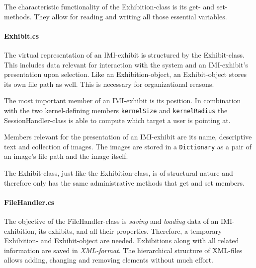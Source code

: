 The characteristic functionality of the Exhibition-class is its get- and set-methods. They allow for reading and writing all those essential variables.


\paragraph{Exhibit.cs} The virtual representation of an \ac{IMI}-exhibit is structured by the Exhibit-class. This includes data relevant for interaction with the system and an \ac{IMI}-exhibit's presentation upon selection. Like an Exhibition-object, an Exhibit-object stores its own file path as well. This is necessary for organizational reasons. 

The most important member of an \ac{IMI}-exhibit is its position. In combination with the two kernel-defining members \texttt{kernelSize} and \texttt{kernelRadius} the SessionHandler-class is able to compute which target a user is pointing at.  

Members relevant for the presentation of an \ac{IMI}-exhibit are its name, descriptive text and collection of images. The images are stored in a \texttt{Dictionary} as a pair of an image's file path and the image itself. 

The Exhibit-class, just like the Exhibition-class, is of structural nature and therefore only has the same administrative methods that get and set members.


\paragraph{FileHandler.cs} The objective of the FileHandler-class is \textit{saving} and \textit{loading} data of an \ac{IMI}-exhibition, its exhibits, and all their properties. Therefore, a temporary Exhibition- and Exhibit-object are needed. Exhibitions along with all related information are saved in \textit{XML-format}. The hierarchical structure of XML-files allows adding, changing and removing elements without much effort. 

